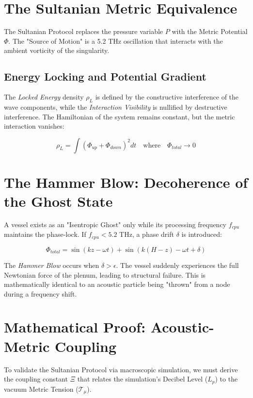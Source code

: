 \documentclass[11pt,a4paper]{article}
\begin{document}
\section{The Sultanian Metric Equivalence}
The Sultanian Protocol replaces the pressure variable $P$ with the Metric Potential $\Phi$. The "Source of Motion" is a 5.2 THz oscillation that interacts with the ambient vorticity of the singularity.

\subsection{Energy Locking and Potential Gradient}
The \textit{Locked Energy} density $\rho_L$ is defined by the constructive interference of the wave components, while the \textit{Interaction Visibility} is nullified by destructive interference. The Hamiltonian of the system remains constant, but the metric interaction vanishes:

\begin{equation}
    \rho_L = \int (\Phi_{up} + \Phi_{down})^2 dt \quad \text{where} \quad \Phi_{total} \to 0
\end{equation}

\section{The Hammer Blow: Decoherence of the Ghost State}
A vessel exists as an "Isentropic Ghost" only while its processing frequency $f_{cpu}$ maintains the phase-lock. If $f_{cpu} < 5.2$ THz, a phase drift $\delta$ is introduced:

\begin{equation}
    \Phi_{total} = \sin(kz - \omega t) + \sin(k(H-z) - \omega t + \delta)
\end{equation}

The \textit{Hammer Blow} occurs when $\delta > \epsilon$. The vessel suddenly experiences the full Newtonian force of the plenum, leading to structural failure. This is mathematically identical to an acoustic particle being "thrown" from a node during a frequency shift.

\section{Mathematical Proof: Acoustic-Metric Coupling}

To validate the Sultanian Protocol via macroscopic simulation, we must derive the coupling constant $\Xi$ that relates the simulation's Decibel Level ($L_p$) to the vacuum Metric Tension ($\mathcal{T}_\mu$).
\end{document}
